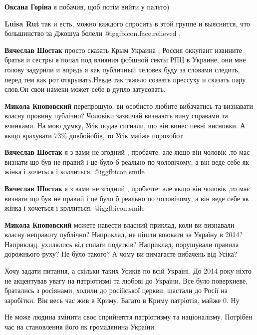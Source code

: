 \begin{itemize}
\begin{itemize}
\textbf{Оксана Горіна} я побачив, щоб потім вийти у пальто)

\textbf{Luisa Rut} так и есть, можно каждого спросить в этой группе и выяснится, что большинство за Джошуа болели @igg{fbicon.face.relieved} .

\textbf{Вячеслав Шостак} просто сказать Крым Украина , Россия оккупант извините братья и сестры я попал под влияния фсбшной секты РПЦ в Украине, они мне голову задурили и впредь я как публичный человек буду за словами следить, перед тем как рот открывать.Невде так тяжело созвать прессуху и сказать пару слов.Он свои намеки может себе в дупло затусовать.

\textbf{Микола Кноповский} перепрошую, ви особисто любите вибачатись та визнавати власну провину публічно? Чоловіки зазвичай визнають вину справами та вчинками.
На мою думку, Усік подав сигнали, що він винес певні висновки. А якщо врахувати 73\% довбойобів, то Усік майже порохобот

\textbf{Вячеслав Шостак} я з вами не згодний , пробачте: але якщо він чоловік ,то має визнати що був не правий і це було б реально по чоловічому, а він веде себе як жінка і хочеться і коллиться. @igg{fbicon.smile} 

\textbf{Вячеслав Шостак} я з вами не згодний , пробачте: але якщо він чоловік ,то має визнати що був не правий і це було б реально по чоловічому, а він веде себе як жінка і хочеться і коллиться. @igg{fbicon.smile} 

\textbf{Микола Кноповский} можете навести власний приклад, коли ви визнавали власну неправоту публічно?
Наприклад, не пішли воювати за Україну в 2014? Наприклад, ухилялись від сплати податків?
Наприклад, порушували правила дорожнього руху?
Не було такого? А чому ви вимагаєте вибачень від Усіка?

\end{itemize} %


Хочу задати питання, а скільки таких Усиків по всій Україні. До 2014 року ніхто
не акцентував увагу на патріотизмі та любові до України. Все було поверхневе,
братались з росіянами, ходили до російської церкви, шастали до Росії на
заробітки. Він весь час жив в Криму. Багато в Криму патріотів, майже 0. Ну

Не може людина змінити своє сприйняття патріотизму та націоналізму. Потрібен
час на становлення його як громадянина України.


\end{itemize}
